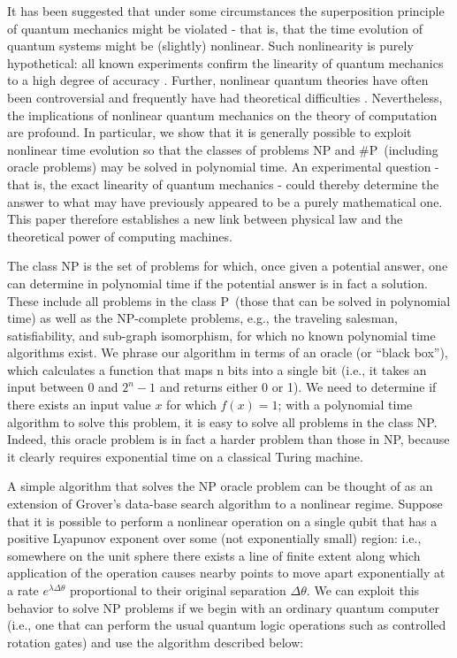 \documentclass[12pt]{article}
\begin{document}
It has been suggested \cite{Weinberg}\cite{Weinberg 2}\cite{Fivel}\cite{Levy}
\cite{Bertolami} that under some circumstances the superposition principle of
quantum mechanics might be violated - that is, that the time evolution of
quantum systems might be (slightly) nonlinear. Such nonlinearity is purely
hypothetical: all known experiments confirm the linearity of quantum mechanics
to a high degree of accuracy \cite{Majumder}\cite{Walsworth}\cite{Chupp}%
\cite{Bollinger}. Further, nonlinear quantum theories have often been
controversial and frequently have had theoretical difficulties \cite{Peres}
\cite{Polchinski}\cite{Gisin}. Nevertheless, the implications of nonlinear
quantum mechanics on the theory of computation are profound. In particular, we
show that it is generally possible to exploit nonlinear time evolution so that
the classes of problems NP and \#P\ (including oracle problems) may be solved
in polynomial time. An experimental question - that is, the exact linearity of
quantum mechanics - could thereby determine the answer to what may have
previously appeared to be a purely mathematical one. This paper therefore
establishes a new link between physical law and the theoretical power of
computing machines.

The class NP is the set of problems for which, once given a potential answer,
one can determine in polynomial time if the potential answer is in fact a
solution. These include all problems in the class P\ (those that can be solved
in polynomial time) as well as the NP-complete problems, e.g., the traveling
salesman, satisfiability, and sub-graph isomorphism, for which no known
polynomial time algorithms exist. We phrase our algorithm in terms of an
oracle (or ``black box''), which calculates a function that maps n bits into a
single bit (i.e., it takes an input between 0 and $2^{n}-1$ and returns either
0 or 1). We need to determine if there exists an input value $x$ for which $f(x)
= 1$; with a polynomial time algorithm to solve this problem, it is easy to
solve all problems in the class NP. Indeed, this oracle problem is in fact a
harder problem than those in NP, because it clearly requires exponential time
on a classical Turing machine.

A simple algorithm that solves the NP oracle problem can be thought of as an
extension of Grover's data-base search algorithm \cite{Grover} to a nonlinear
regime. Suppose that it is possible to perform a nonlinear operation on a
single qubit that has a positive Lyapunov exponent over some (not
exponentially small) region: i.e., somewhere on the unit sphere there exists a
line of finite extent along which application of the operation causes nearby
points to move apart exponentially at a rate $e^{\lambda\Delta\theta}$
proportional to their original separation $\Delta\theta.$ We can exploit this
behavior to solve NP problems if we begin with an ordinary quantum computer
(i.e., one that can perform the usual quantum logic operations such as
controlled rotation gates) and use the algorithm described below:
\end{document}
